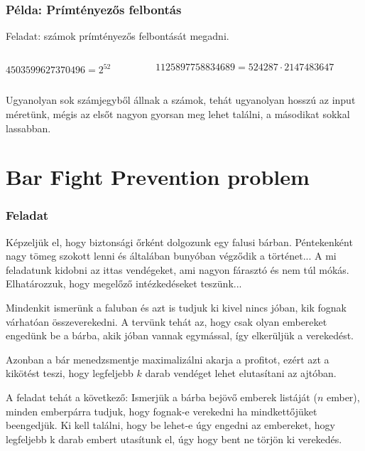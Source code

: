 \documentclass[aspectratio=169]{beamer}
\newcommand{\mkspace}{\vspace{19pt}}
\begin{document}
\begin{frame}[t]
\frametitle{Példa: Prímtényezős felbontás}

Feladat: számok prímtényezős felbontását megadni.

\mkspace
\begin{columns}
\begin{column}{0.487\textwidth}
$4503599627370496 = 2^{52}$
\end{column}
\begin{column}{0.487\textwidth}
$1125897758834689 = 524287 \cdot 2147483647$
\end{column}
\end{columns}
\mkspace

Ugyanolyan sok számjegyből állnak a számok, tehát ugyanolyan hosszú az input méretünk, mégis az elsőt
nagyon gyorsan meg lehet találni, a másodikat sokkal lassabban.

\end{frame}


\section{Bar Fight Prevention problem}

\begin{frame}
\frametitle{Feladat}
Képzeljük el, hogy biztonsági őrként dolgozunk egy falusi bárban. Péntekenként nagy tömeg szokott lenni és
általában bunyóban végződik a történet... A mi feladatunk kidobni az ittas vendégeket, ami nagyon fárasztó
és nem túl mókás. Elhatározzuk, hogy megelőző intézkedéseket teszünk...

Mindenkit ismerünk a faluban és azt is tudjuk ki kivel nincs jóban, kik fognak várhatóan összeverekedni.
A tervünk tehát az, hogy csak olyan embereket engedünk be a bárba, akik jóban vannak egymással, így
elkerüljük a verekedést.

Azonban a bár menedzsmentje maximalizálni akarja a profitot, ezért azt a kikötést teszi, hogy legfeljebb
$k$ darab vendéget lehet elutasítani az ajtóban.

A feladat tehát a következő: Ismerjük a bárba bejövő emberek listáját ($n$ ember), minden emberpárra
tudjuk, hogy fognak-e verekedni ha mindkettőjüket beengedjük. Ki kell találni, hogy be lehet-e úgy
engedni az embereket, hogy legfeljebb k darab embert utasítunk el, úgy hogy bent ne törjön ki verekedés.
\end{frame}
\end{document}
